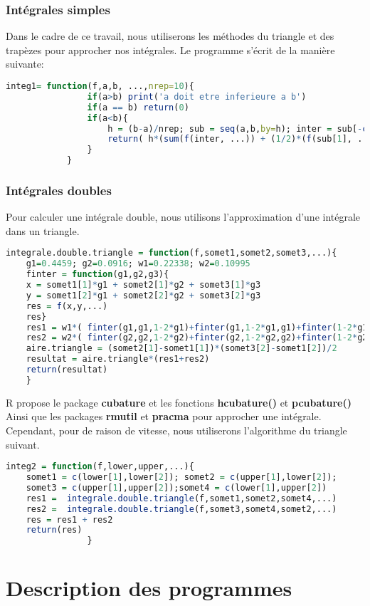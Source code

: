 \documentclass[12pt,a4paper]{scrbook}
\begin{document}
	\subsection{Intégrales simples}
Dans le cadre de ce travail, nous utiliserons les méthodes du triangle et des trapèzes pour approcher nos intégrales. Le programme s'écrit de la manière suivante:
	\begin{lstlisting}[language=R]
			integ1= function(f,a,b, ...,nrep=10){
				if(a>b) print('a doit etre inferieure a b')
				if(a == b) return(0)
				if(a<b){
					h = (b-a)/nrep; sub = seq(a,b,by=h); inter = sub[-c(1,length(sub))] 
					return( h*(sum(f(inter, ...)) + (1/2)*(f(sub[1], ...)+f(sub[length(sub)], ...))))
				}
			}
	\end{lstlisting}
	\subsection{Intégrales doubles}
Pour calculer une intégrale double, nous utilisons l'approximation d'une intégrale dans un triangle.
	\begin{lstlisting}[language=R]
	integrale.double.triangle = function(f,somet1,somet2,somet3,...){ 
	g1=0.4459; g2=0.0916; w1=0.22338; w2=0.10995    
	finter = function(g1,g2,g3){
	x = somet1[1]*g1 + somet2[1]*g2 + somet3[1]*g3
	y = somet1[2]*g1 + somet2[2]*g2 + somet3[2]*g3
	res = f(x,y,...)
	res}
	res1 = w1*( finter(g1,g1,1-2*g1)+finter(g1,1-2*g1,g1)+finter(1-2*g1,g1,g1) )
	res2 = w2*( finter(g2,g2,1-2*g2)+finter(g2,1-2*g2,g2)+finter(1-2*g2,g2,g2) )
	aire.triangle = (somet2[1]-somet1[1])*(somet3[2]-somet1[2])/2
	resultat = aire.triangle*(res1+res2)
	return(resultat)
	}
	\end{lstlisting} 
	R propose le package \textbf{cubature} et les fonctions \textbf{hcubature()} et \textbf{pcubature()} Ainsi que les packages \textbf{rmutil} et \textbf{pracma} pour approcher une intégrale. Cependant, pour de raison de vitesse, nous utiliserons l'algorithme du triangle suivant.
	\begin{lstlisting}[language=R]
	integ2 = function(f,lower,upper,...){ 
	somet1 = c(lower[1],lower[2]); somet2 = c(upper[1],lower[2]); 
	somet3 = c(upper[1],upper[2]);somet4 = c(lower[1],upper[2])
	res1 =  integrale.double.triangle(f,somet1,somet2,somet4,...)
	res2 =  integrale.double.triangle(f,somet3,somet4,somet2,...)
	res = res1 + res2
	return(res)
		    	}
    \end{lstlisting}
	\chapter{Description des programmes}
\end{document}
